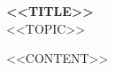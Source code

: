 \documentclass[12pt, a4paper]{article}
\begin{document}
\begin{center}
    {\Large\textbf{<<TITLE>>}}\\[0.5cm]
    {\large <<TOPIC>>}
\end{center}
\vspace{1cm}

<<CONTENT>>
\end{document}
